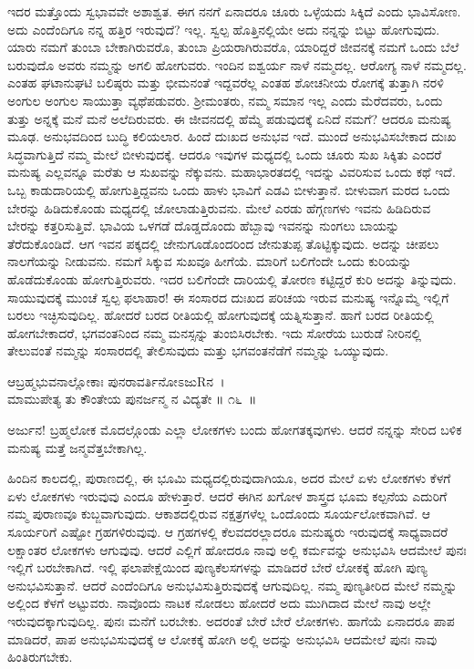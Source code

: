 ಇದರ ಮತ್ತೊಂದು ಸ್ವಭಾವವೇ ಅಶಾಶ್ವತ. ಈಗ ನನಗೆ ಏನಾದರೂ ಚೂರು ಒಳ್ಳೆಯದು ಸಿಕ್ಕಿದೆ ಎಂದು ಭಾವಿಸೋಣ. ಅದು ಎಂದೆಂದಿಗೂ ನನ್ನ ಹತ್ತಿರ ಇರುವುದೆ? ಇಲ್ಲ. ಸ್ವಲ್ಪ ಹೊತ್ತಿನಲ್ಲಿಯೇ ಅದು ನನ್ನನ್ನು ಬಿಟ್ಟು ಹೋಗುವುದು. ಯಾರು ನಮಗೆ ತುಂಬಾ ಬೇಕಾಗಿರುವರೊ, ತುಂಬಾ ಪ್ರಿಯರಾಗಿರುವರೊ, ಯಾರಿದ್ದರೆ ಜೀವನಕ್ಕೆ ನಮಗೆ ಒಂದು ಬೆಲೆ ಬರುವುದೊ ಅವರು ನಮ್ಮನ್ನು ಅಗಲಿ ಹೋಗುವರು. ಇಂದಿನ ಐಶ್ವರ್ಯ ನಾಳೆ ನಮ್ಮದಲ್ಲ. ಆರೋಗ್ಯ ನಾಳೆ ನಮ್ಮದಲ್ಲ. ಎಂತಹ ಘಟಾನುಘಟಿ ಬಲಿಷ್ಠರು ಮತ್ತು ಭೀಮನಂತೆ ಇದ್ದವರೆಲ್ಲ ಎಂತಹ ಶೋಚನೀಯ ರೋಗಕ್ಕೆ ತುತ್ತಾಗಿ ನರಳಿ ಅಂಗುಲ ಅಂಗುಲ ಸಾಯುತ್ತಾ ವ್ಯಥೆಪಡುವರು. ಶ‍್ರೀಮಂತರು, ನಮ್ಮ ಸಮಾನ ಇಲ್ಲ ಎಂದು ಮೆರೆದವರು, ಒಂದು ತುತ್ತು ಅನ್ನಕ್ಕೆ ಮನೆ ಮನೆ ಅಲೆದಿರುವರು. ಈ ಜೀವನದಲ್ಲಿ ಹೆಮ್ಮೆ ಪಡುವುದಕ್ಕೆ ಏನಿದೆ ನಮಗೆ? ಆದರೂ ಮನುಷ್ಯ ಮೂಢ. ಅನುಭವದಿಂದ ಬುದ್ಧಿ ಕಲಿಯಲಾರ. ಹಿಂದೆ ದುಃಖದ ಅನುಭವ ಇದೆ. ಮುಂದೆ ಅನುಭವಿಸಬೇಕಾದ ದುಃಖ ಸಿದ್ಧವಾಗುತ್ತಿದೆ ನಮ್ಮ ಮೇಲೆ ಬೀಳುವುದಕ್ಕೆ. ಆದರೂ ಇವುಗಳ ಮಧ್ಯದಲ್ಲಿ ಒಂದು ಚೂರು ಸುಖ ಸಿಕ್ಕಿತು ಎಂದರೆ ಮನುಷ್ಯ ಎಲ್ಲವನ್ನೂ ಮರೆತು ಆ ಸುಖವನ್ನು ನೆಕ್ಕುವನು. ಮಹಾಭಾರತದಲ್ಲಿ ಇದನ್ನು ವಿವರಿಸುವ ಒಂದು ಕಥೆ ಇದೆ. ಒಬ್ಬ ಕಾಡುದಾರಿಯಲ್ಲಿ ಹೋಗುತ್ತಿದ್ದವನು ಒಂದು ಹಾಳು ಭಾವಿಗೆ ಎಡವಿ ಬೀಳುತ್ತಾನೆ. ಬೀಳುವಾಗ ಮರದ ಒಂದು ಬೇರನ್ನು ಹಿಡಿದುಕೊಂಡು ಮಧ್ಯದಲ್ಲಿ ಜೋಲಾಡುತ್ತಿರುವನು. ಮೇಲೆ ಎರಡು ಹೆಗ್ಗಣಗಳು ಇವನು ಹಿಡಿದಿರುವ ಬೇರನ್ನು ಕತ್ತರಿಸುತ್ತಿವೆ. ಭಾವಿಯ ಒಳಗಡೆ ದೊಡ್ಡದೊಂದು ಹೆಬ್ಬಾವು ಇವನನ್ನು ನುಂಗಲು ಬಾಯನ್ನು ತೆರೆದುಕೊಂಡಿದೆ. ಆಗ ಇವನ ಪಕ್ಕದಲ್ಲಿ ಜೇನುಗೂಡೊಂದರಿಂದ ಜೇನುತುಪ್ಪ ತೊಟ್ಟಿಕ್ಕುವುದು. ಅದನ್ನು ಚೀಪಲು ನಾಲಗೆಯನ್ನು ನೀಡುವನು. ನಮಗೆ ಸಿಕ್ಕುವ ಸುಖವೂ ಹೀಗೆಯೆ. ಮಾರಿಗೆ ಬಲಿಗೆಂದೇ ಒಂದು ಕುರಿಯನ್ನು ಹೊಡೆದುಕೊಂಡು ಹೋಗುತ್ತಿರುವರು. ಇದರ ಬಲಿಗೆಂದೇ ದಾರಿಯಲ್ಲಿ ತೋರಣ ಕಟ್ಟಿದ್ದರೆ ಕುರಿ ಅದನ್ನು ತಿನ್ನುವುದು. ಸಾಯುವುದಕ್ಕೆ ಮುಂಚೆ ಸ್ವಲ್ಪ ಫಲಾಹಾರ! ಈ ಸಂಸಾರದ ದುಃಖದ ಪರಿಚಯ ಇರುವ ಮನುಷ್ಯ ಇನ್ನೊಮ್ಮೆ ಇಲ್ಲಿಗೆ ಬರಲು ಇಚ್ಛಿಸುವುದಿಲ್ಲ. ಹೋದರೆ ಬರದ ರೀತಿಯಲ್ಲಿ ಹೋಗುವುದಕ್ಕೆ ಯತ್ನಿಸುತ್ತಾನೆ. ಹಾಗೆ ಬರದ ರೀತಿಯಲ್ಲಿ ಹೋಗಬೇಕಾದರೆ, ಭಗವಂತನಿಂದ ನಮ್ಮ ಮನಸ್ಸನ್ನು ತುಂಬಿಸಿರಬೇಕು. ಇದು ಸೋರೆಯ ಬುರುಡೆ ನೀರಿನಲ್ಲಿ ತೇಲುವಂತೆ ನಮ್ಮನ್ನು ಸಂಸಾರದಲ್ಲಿ ತೇಲಿಸುವುದು ಮತ್ತು ಭಗವಂತನೆಡೆಗೆ ನಮ್ಮನ್ನು ಒಯ್ಯುವುದು.

\begin{shloka}
ಆಬ್ರಹ್ಮಭುವನಾಲ್ಲೋಕಾಃ ಪುನರಾವರ್ತಿನೋಽಜುRನ~।\\ಮಾಮುಪೇತ್ಯ ತು ಕೌಂತೇಯ ಪುನರ್ಜನ್ಮ ನ ವಿದ್ಯತೇ \hfill॥ ೧೬~॥
\end{shloka}

\begin{artha}
ಅರ್ಜುನ! ಬ್ರಹ್ಮಲೋಕ ಮೊದಲ್ಗೊಂಡು ಎಲ್ಲಾ ಲೋಕಗಳು ಬಂದು ಹೋಗತಕ್ಕವುಗಳು. ಆದರೆ ನನ್ನನ್ನು ಸೇರಿದ ಬಳಿಕ ಮನುಷ್ಯ ಮತ್ತೆ ಜನ್ಮವೆತ್ತಬೇಕಾಗಿಲ್ಲ.
\end{artha}

ಹಿಂದಿನ ಕಾಲದಲ್ಲಿ, ಪುರಾಣದಲ್ಲಿ, ಈ ಭೂಮಿ ಮಧ್ಯದಲ್ಲಿರುವುದಾಗಿಯೂ, ಅದರ ಮೇಲೆ ಏಳು ಲೋಕಗಳು ಕೆಳಗೆ ಏಳು ಲೋಕಗಳು ಇರುವುವು ಎಂದೂ ಹೇಳುತ್ತಾರೆ. ಆದರೆ ಈಗಿನ ಖಗೋಳ ಶಾಸ್ತ್ರದ ಭೂಮ ಕಲ್ಪನೆಯ ಎದುರಿಗೆ ನಮ್ಮ ಪುರಾಣವೂ ಕುಬ್ಜವಾಗುವುದು. ಆಕಾಶದಲ್ಲಿರುವ ನಕ್ಷತ್ರಗಳೆಲ್ಲ ಒಂದೊಂದು ಸೂರ್ಯಲೋಕವಾಗಿವೆ. ಆ ಸೂರ್ಯರಿಗೆ ಎಷ್ಟೋ ಗ್ರಹಗಳಿರುವುವು. ಆ ಗ್ರಹಗಳಲ್ಲಿ ಕೆಲವದರಲ್ಲಾದರೂ ಮನುಷ್ಯರು ಇರುವುದಕ್ಕೆ ಸಾಧ್ಯವಾದರೆ ಲಕ್ಷಾಂತರ ಲೋಕಗಳು ಆಗುವುವು. ಆದರೆ ಎಲ್ಲಿಗೆ ಹೋದರೂ ನಾವು ಅಲ್ಲಿ ಕರ್ಮವನ್ನು ಅನುಭವಿಸಿ ಆದಮೇಲೆ ಪುನಃ ಇಲ್ಲಿಗೆ ಬರಬೇಕಾಗಿದೆ. ಇಲ್ಲಿ ಫಲಾಪೇಕ್ಷೆಯಿಂದ ಪುಣ್ಯಕೆಲಸಗಳನ್ನು ಮಾಡಿದರೆ ಬೇರೆ ಲೋಕಕ್ಕೆ ಹೋಗಿ ಪುಣ್ಯ ಅನುಭವಿಸುತ್ತಾನೆ. ಆದರೆ ಎಂದೆಂದಿಗೂ ಅನುಭವಿಸುತ್ತಿರುವುದಕ್ಕೆ ಆಗುವುದಿಲ್ಲ. ನಮ್ಮ ಪುಣ್ಯತೀರಿದ ಮೇಲೆ ನಮ್ಮನ್ನು ಅಲ್ಲಿಂದ ಕೆಳಗೆ ಅಟ್ಟುವರು. ನಾವೊಂದು ನಾಟಕ ನೋಡಲು ಹೋದರೆ ಅದು ಮುಗಿದಾದ ಮೇಲೆ ನಾವು ಅಲ್ಲೇ ಇರುವುದಕ್ಕಾಗುವುದಿಲ್ಲ. ಪುನಃ ಮನೆಗೆ ಬರಬೇಕು. ಅದರಂತೆ ಬೇರೆ ಬೇರೆ ಲೋಕಗಳು. ಹಾಗೆಯೆ ಏನಾದರೂ ಪಾಪ ಮಾಡಿದರೆ, ಪಾಪ ಅನುಭವಿಸುವುದಕ್ಕೆ ಆ ಲೋಕಕ್ಕೆ ಹೋಗಿ ಅಲ್ಲಿ ಅದನ್ನು ಅನುಭವಿಸಿ ಆದಮೇಲೆ ಪುನಃ ನಾವು ಹಿಂತಿರುಗಬೇಕು.

